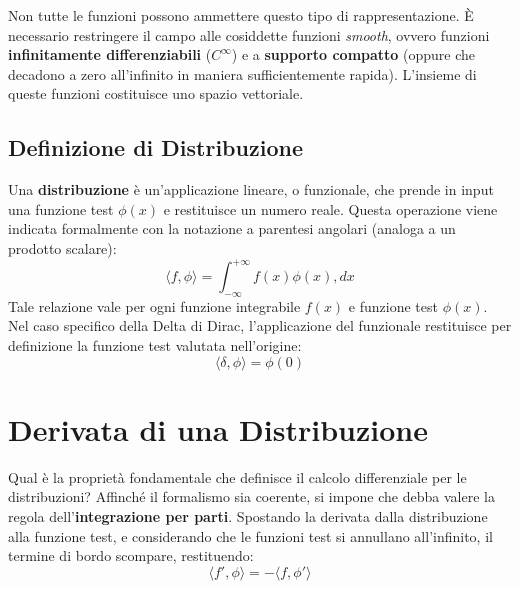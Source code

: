 Non tutte le funzioni possono ammettere questo tipo di rappresentazione. È necessario restringere il campo alle cosiddette funzioni \textit{smooth}, ovvero funzioni \textbf{infinitamente differenziabili} ($C^\infty$) e a \textbf{supporto compatto} (oppure che decadono a zero all'infinito in maniera sufficientemente rapida). L'insieme di queste funzioni costituisce uno spazio vettoriale.

\subsection{Definizione di Distribuzione}
Una \textbf{distribuzione} è un'applicazione lineare, o funzionale, che prende in input una funzione test $\phi(x)$ e restituisce un numero reale. Questa operazione viene indicata formalmente con la notazione a parentesi angolari (analoga a un prodotto scalare):
\begin{equation}
\langle f, \phi \rangle = \int_{-\infty}^{+\infty} f(x) \phi(x) , dx
\end{equation}
Tale relazione vale per ogni funzione integrabile $f(x)$ e funzione test $\phi(x)$.
Nel caso specifico della Delta di Dirac, l'applicazione del funzionale restituisce per definizione la funzione test valutata nell'origine:
\begin{equation}
\langle \delta, \phi \rangle = \phi(0)
\end{equation}

\section{Derivata di una Distribuzione}

Qual è la proprietà fondamentale che definisce il calcolo differenziale per le distribuzioni? Affinché il formalismo sia coerente, si impone che debba valere la regola dell'\textbf{integrazione per parti}. Spostando la derivata dalla distribuzione alla funzione test, e considerando che le funzioni test si annullano all'infinito, il termine di bordo scompare, restituendo:
\begin{equation}
\langle f', \phi \rangle = - \langle f, \phi' \rangle
\end{equation}

